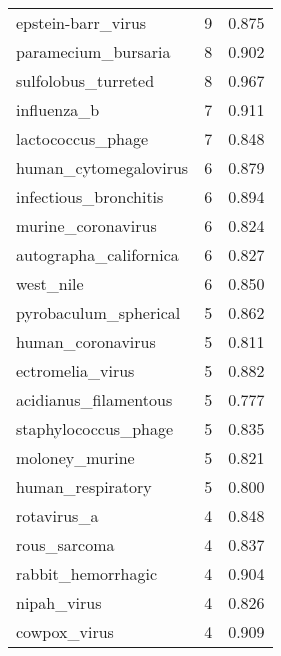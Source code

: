 \begin{tabular}{lrr}
                       epstein-barr\_virus &                   9 &     0.875 \\
                      paramecium\_bursaria &                   8 &     0.902 \\
                      sulfolobus\_turreted &                   8 &     0.967 \\
                              influenza\_b &                   7 &     0.911 \\
                        lactococcus\_phage &                   7 &     0.848 \\
                    human\_cytomegalovirus &                   6 &     0.879 \\
                    infectious\_bronchitis &                   6 &     0.894 \\
                       murine\_coronavirus &                   6 &     0.824 \\
                   autographa\_californica &                   6 &     0.827 \\
                                west\_nile &                   6 &     0.850 \\
                    pyrobaculum\_spherical &                   5 &     0.862 \\
                        human\_coronavirus &                   5 &     0.811 \\
                         ectromelia\_virus &                   5 &     0.882 \\
                    acidianus\_filamentous &                   5 &     0.777 \\
                     staphylococcus\_phage &                   5 &     0.835 \\
                           moloney\_murine &                   5 &     0.821 \\
                        human\_respiratory &                   5 &     0.800 \\
                              rotavirus\_a &                   4 &     0.848 \\
                             rous\_sarcoma &                   4 &     0.837 \\
                       rabbit\_hemorrhagic &                   4 &     0.904 \\
                              nipah\_virus &                   4 &     0.826 \\
                             cowpox\_virus &                   4 &     0.909 \\

\end{tabular}
